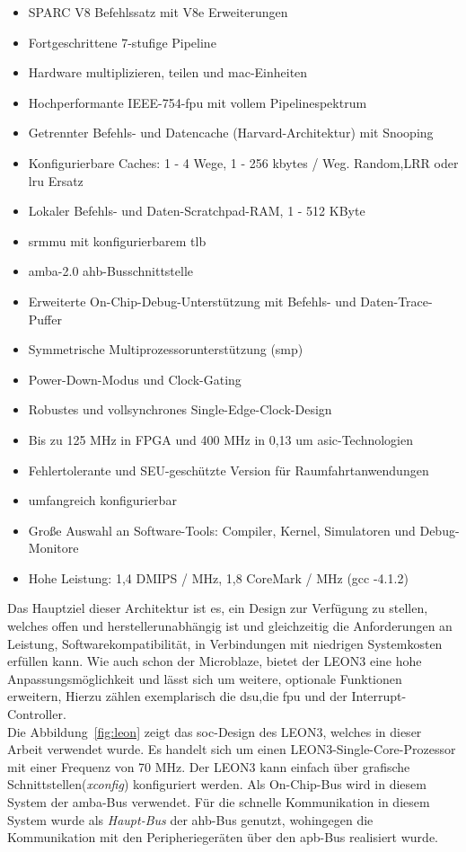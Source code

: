 \begin{itemize}
  \item SPARC V8 Befehlssatz mit V8e Erweiterungen
\item Fortgeschrittene 7-stufige Pipeline
\item Hardware multiplizieren, teilen und \ac{mac}-Einheiten
\item Hochperformante IEEE-754-\ac{fpu} mit vollem Pipelinespektrum
\item Getrennter Befehls- und Datencache (Harvard-Architektur) mit Snooping
\item Konfigurierbare Caches: 1 - 4 Wege, 1 - 256 kbytes / Weg. Random,LRR oder \ac{lru} Ersatz
\item Lokaler Befehls- und Daten-Scratchpad-RAM, 1 - 512 KByte
\item \ac{srmmu} mit konfigurierbarem \ac{tlb}
\item \ac{amba}-2.0 \ac{ahb}-Busschnittstelle
\item Erweiterte On-Chip-Debug-Unterstützung mit Befehls- und Daten-Trace-Puffer
\item Symmetrische Multiprozessorunterstützung (\ac{smp})
\item Power-Down-Modus und Clock-Gating
\item Robustes und vollsynchrones Single-Edge-Clock-Design
\item Bis zu 125 MHz in FPGA und 400 MHz in 0,13 um \ac{asic}-Technologien
\item Fehlertolerante und SEU-geschützte Version für Raumfahrtanwendungen
\item umfangreich konfigurierbar
\item Große Auswahl an Software-Tools: Compiler, Kernel, Simulatoren und Debug-Monitore
\item Hohe Leistung: 1,4 DMIPS / MHz, 1,8 CoreMark / MHz (gcc -4.1.2)
\end{itemize}

Das Hauptziel dieser Architektur ist es, ein Design zur Verfügung zu stellen, welches offen und herstellerunabhängig ist und gleichzeitig die Anforderungen an Leistung, Softwarekompatibilität,
in Verbindungen mit niedrigen Systemkosten erfüllen kann. Wie auch schon der Microblaze, bietet der LEON3 eine hohe Anpassungsmöglichkeit und lässt sich um weitere, optionale Funktionen erweitern,
Hierzu zählen exemplarisch die \ac{dsu},die  \ac{fpu} und der Interrupt-Controller.\\
Die Abbildung~\ref{fig:leon} zeigt das \ac{soc}-Design des LEON3, welches in dieser Arbeit verwendet wurde. Es handelt sich um einen LEON3-Single-Core-Prozessor mit einer Frequenz von
70 MHz. Der LEON3 kann einfach über grafische Schnittstellen(\emph{xconfig}) konfiguriert werden. Als On-Chip-Bus wird in diesem System der \ac{amba}-Bus verwendet.
Für die schnelle Kommunikation in diesem System wurde als \emph{Haupt-Bus} der \ac{ahb}-Bus genutzt, wohingegen die Kommunikation mit den Peripheriegeräten über den \ac{apb}-Bus realisiert wurde.\\


